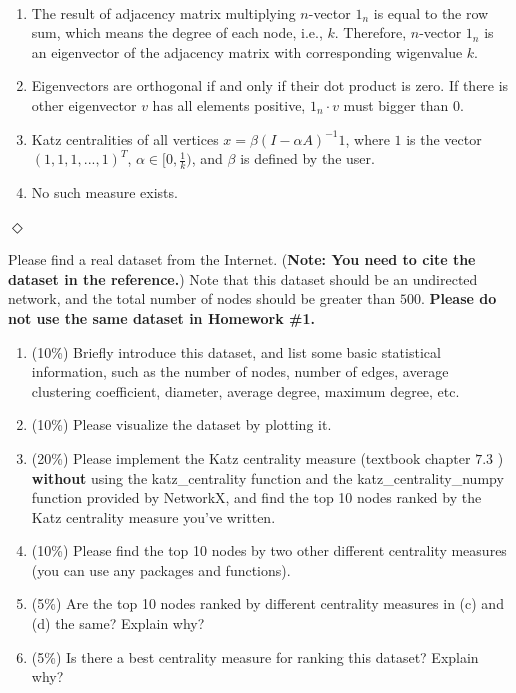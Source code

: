 \documentclass[12pt]{article}
\newcommand {\bsolution}{\noindent {\em Solution:} \ }
\newcommand{\esolution}{\hfill $\Diamond$ \\ \vspace{.3cm}}
\begin{document}
\bsolution
\begin{enumerate}[label=(\alph*)]
	\item The result of adjacency matrix multiplying $n$-vector $1_n$ is equal to the row sum, which means the degree of each node, i.e., $k$. Therefore, $n$-vector $1_n$ is an eigenvector of the adjacency matrix with corresponding wigenvalue $k$.
	\item Eigenvectors are orthogonal if and only if their dot product is zero. If there is other eigenvector $v$ has all elements positive, $1_n \cdot v$ must bigger than 0.
	\item Katz centralities of all vertices $x=\beta (I-\alpha A)^{-1} 1$, where $1$ is the vector $(1, 1, 1, ..., 1)^T$, $\alpha\in [0, \frac{1}{k})$, and $\beta$ is defined by the user.
	\item No such measure exists.
\end{enumerate}
\esolution



\newpage
Please find a real dataset from the Internet. ({\bf Note: You need to cite the dataset in the reference.}) Note that this dataset should be an undirected network, and the total number of nodes should be greater than $500$. {\bf Please do not use the same dataset in Homework \#1.}

\begin{enumerate}[label=(\alph*)]
	\item (10\%) Briefly introduce this dataset, and list some basic statistical information, such as the number of nodes, number of edges, average clustering coefficient, diameter, average degree, maximum degree, etc.
	\item (10\%) Please visualize the dataset by plotting it. 
	\item (20\%) Please implement the Katz centrality measure (textbook chapter $7.3$ \cite{newman2010networks}) {\bf without} using the katz\_centrality function and the katz\_centrality\_numpy function provided by NetworkX, and find the top 10 nodes ranked by the Katz centrality measure you've written.
	\item (10\%) Please find the top 10 nodes by two other different centrality measures (you can use any packages and functions).
	\item (5\%) Are the top 10 nodes ranked by different centrality measures in (c) and (d) the same? Explain why?
	\item (5\%) Is there a best centrality measure for ranking this dataset? Explain why?
\end{enumerate}
\end{document}
